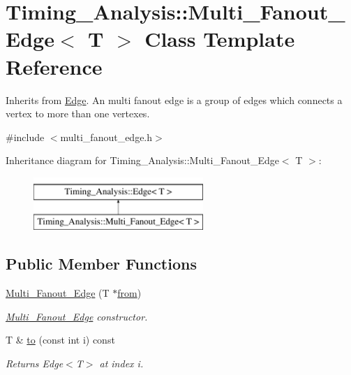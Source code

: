 \hypertarget{classTiming__Analysis_1_1Multi__Fanout__Edge}{\section{Timing\-\_\-\-Analysis\-:\-:Multi\-\_\-\-Fanout\-\_\-\-Edge$<$ T $>$ Class Template Reference}
\label{classTiming__Analysis_1_1Multi__Fanout__Edge}
}


Inherits from \hyperlink{classTiming__Analysis_1_1Edge}{Edge}. An multi fanout edge is a group of edges which connects a vertex to more than one vertexes.  




{\ttfamily \#include $<$multi\-\_\-fanout\-\_\-edge.\-h$>$}

Inheritance diagram for Timing\-\_\-\-Analysis\-:\-:Multi\-\_\-\-Fanout\-\_\-\-Edge$<$ T $>$\-:\begin{figure}[H]
\begin{center}
\leavevmode
\includegraphics[height=2.000000cm]{classTiming__Analysis_1_1Multi__Fanout__Edge}
\end{center}
\end{figure}
\subsection*{Public Member Functions}
\begin{DoxyCompactItemize}
\item 
\hyperlink{classTiming__Analysis_1_1Multi__Fanout__Edge_a877f7672fb4fbabf49943fd3c86b7f59}{Multi\-\_\-\-Fanout\-\_\-\-Edge} (T $\ast$\hyperlink{classTiming__Analysis_1_1Edge_a47020ea89fd9fde438adc814a731a23d}{from})
\begin{DoxyCompactList}\small\item\em \hyperlink{classTiming__Analysis_1_1Multi__Fanout__Edge}{Multi\-\_\-\-Fanout\-\_\-\-Edge} constructor. \end{DoxyCompactList}\item 
T \& \hyperlink{classTiming__Analysis_1_1Multi__Fanout__Edge_a77ac79088e9ef11d222e777e2963f676}{to} (const int i) const 
\begin{DoxyCompactList}\small\item\em Returns Edge$<$\-T$>$ at index i. \end{DoxyCompactList}\end{DoxyCompactItemize}

